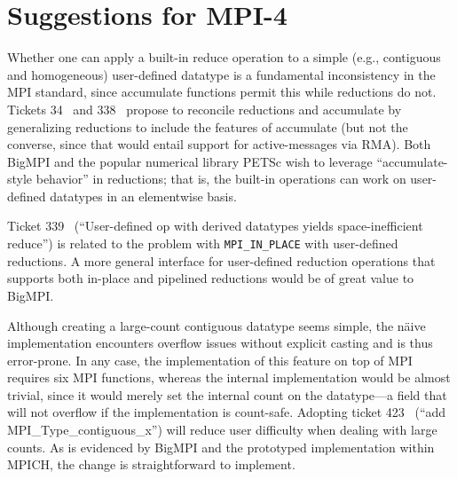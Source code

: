 
\section{Suggestions for MPI-4}
\label{sec:mpi4}


Whether one can apply a built-in reduce operation to a simple 
(e.g., contiguous and homogeneous) user-defined datatype
is a fundamental inconsistency in the MPI standard, since accumulate
functions permit this while reductions do not.
Tickets 34~\cite{ticket34} and 338~\cite{ticket338}
propose to reconcile reductions and accumulate by generalizing
reductions to include the features of accumulate
(but not the converse, since that would entail support for active-messages via RMA).
Both BigMPI and the popular numerical library PETSc wish to leverage 
``accumulate-style behavior'' in reductions; that is,  the built-in operations 
can work on user-defined datatypes in an elementwise basis.

Ticket 339~\cite{ticket339} %
(``User-defined op with derived datatypes yields space-inefficient reduce'')
is related to the problem with \texttt{MPI\_IN\_PLACE} with user-defined reductions.
A more general interface for user-defined reduction operations that supports both
in-place and pipelined reductions would be of great value to BigMPI.

Although creating a large-count contiguous datatype seems simple,
the n{\"a}ive implementation encounters overflow issues without explicit casting and is
thus error-prone.  In any case, the implementation of this feature on top of MPI
requires six MPI functions, whereas the internal implementation would be almost trivial,
since it would merely set the internal count on the datatype---a field that will not overflow 
if the implementation is count-safe.
Adopting ticket 423~\cite{ticket423} %
(``add MPI\_Type\_contiguous\_x'') will reduce user difficulty when dealing with large counts.
As is evidenced by BigMPI and the prototyped implementation within MPICH, 
the change is straightforward to implement.

